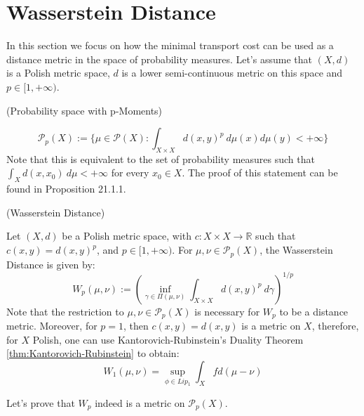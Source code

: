 \newpage
\section{Wasserstein Distance}

In this section we focus on how the minimal transport cost can be used as a distance metric
in the space of probability measures. Let's assume that $(X,d)$ is a Polish metric space,
$d$ is a lower semi-continuous metric on this space and $ p \in [1,+\infty)$.

\begin{definition}(Probability space with p-Moments)

  \begin{equation}
    \mathcal P_p(X) := \{
         \mu \in \mathcal P(X): \int_{X \times X} d(x,y)^p \ d \mu(x) d \mu(y) < +\infty
      \}
  \label{eq:Pp}
  \end{equation}
  Note that this is equivalent to the set of probability measures such that $\int_X d(x,x_0) \ d\mu<+\infty$
  for every $x_0 \in X$. The proof of this statement can be found
  in \citet{garling2018analysis} Proposition 21.1.1.
\end{definition}

\begin{definition}(Wasserstein Distance)

  Let $(X,d)$ be a Polish metric space, with $c:X \times X \to \mathbb R$ such that $c(x,y)=d(x,y)^p$, and
  $p \in [1,+\infty)$.
  For $\mu,\nu \in \mathcal P_p(X)$, the Wasserstein Distance is given by:
  \begin{equation}
    W_p(\mu,\nu) :=
    \left(
    \inf_{\gamma \in \Pi(\mu,\nu)}
    \int_{X \times X} d(x,y)^p \ d\gamma
    \right)^{1/p}
    \label{def:Wasserstein}
  \end{equation}
  Note that the restriction to $\mu,\nu \in \mathcal P_p(X)$ is necessary for $W_p$ to be a distance metric.
  Moreover, for $p=1$, then $c(x,y) = d(x,y)$ is a metric on $X$, therefore, for $X$ Polish, one can
  use Kantorovich-Rubinstein's Duality Theorem \ref{thm:Kantorovich-Rubinstein} to obtain:
  \begin{equation}
    W_1(\mu,\nu) =
    \sup_{\phi \in Lip_1} \int_X f d (\mu - \nu)
  \end{equation}
\end{definition}

Let's prove that $W_p$ indeed is a metric on $\mathcal P_p(X)$.

